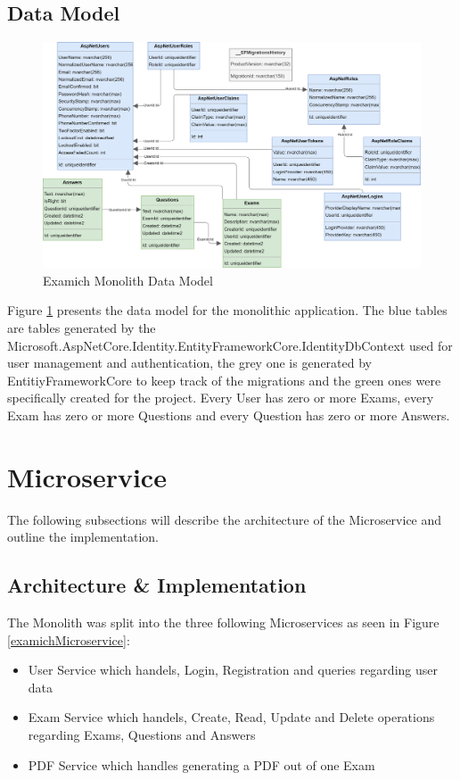 \documentclass[BIF,Bachelor,nenglish]{twbook}%
\begin{document}
\subsection{Data Model}

\begin{figure} [H]
 \begin{center}
    \includegraphics[width=1.1\linewidth]{img/ExamichDataModel.png}
 \end{center}
 \caption{Examich Monolith Data Model}
 \label{datamodel}
\end{figure}

Figure \ref{datamodel} presents the data model for the monolithic application. The blue tables are tables generated by the Microsoft.AspNetCore.Identity.EntityFrameworkCore.IdentityDbContext used for user management and authentication, the grey one is generated by EntitiyFrameworkCore to keep track of the migrations and the green ones were specifically created for the project. Every User has zero or more Exams, every Exam has zero or more Questions and every Question has zero or more Answers.


\section{Microservice}
The following subsections will describe the architecture of the Microservice and outline the implementation.

\subsection{Architecture \& Implementation}
The Monolith was split into the three following Microservices as seen in Figure \ref{examichMicroservice}:

\begin{itemize}
\item User Service which handels, Login, Registration and queries regarding user data
\item Exam Service which handels, Create, Read, Update and Delete operations regarding Exams, Questions and Answers
\item PDF Service which handles generating a PDF out of one Exam
\end{itemize}
\end{document}
